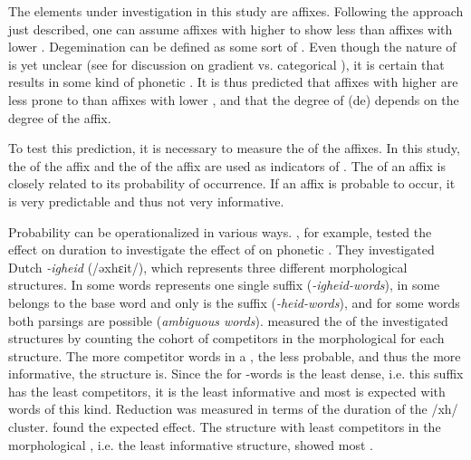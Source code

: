 {{The elements under investigation in this study are affixes. Following the approach just described, one can assume affixes with higher  to show less  than affixes with lower . Degemination can be defined as some sort of . Even though the nature of  is yet unclear (see  for discussion on gradient vs. categorical ), it is certain that  results in some kind of phonetic . It is thus predicted that affixes with higher  are less prone to  than affixes with lower , and that the degree of (de) depends on the degree  of the affix.

To test this prediction, it is necessary to measure the  of the affixes.
 In this study, the  of the affix and the  of the affix are used as indicators of .
The  of an affix is closely related to its probability of occurrence. 
 If an affix is probable to occur, it is very predictable and thus not very informative. %

 
 Probability can be operationalized in various ways. 
   \cite{Pluymaekers.2010}, for example, tested the effect  on duration to investigate the effect of  on phonetic .
 They investigated Dutch \textit{-igheid} (/əxhɛit/), which represents three different morphological structures. In some words  represents one single suffix (\textit{\textit{-igheid}-words}), in some  belongs to the base word and only  is the suffix (\textit{-heid-words}), and for some words both parsings are possible (\textit{ambiguous words}). \cite{Pluymaekers.2010} measured the  of the investigated structures by counting the cohort of competitors in the morphological  for each structure. 
 The more competitor words in a , the less probable, and thus the more informative, the structure is.  Since the  for -words is the least dense, i.e. this suffix has the least competitors, it is the least informative and most  is expected with words of this kind. Reduction was measured in terms of the duration of the /xh/ cluster. \cite{Pluymaekers.2010} found the expected effect. The structure with least competitors in the morphological , i.e. the least informative structure, showed most .
  
}}
